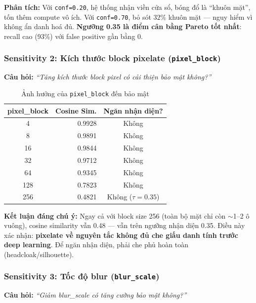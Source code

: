 \textbf{Phân tích:} Với \texttt{conf=0.20}, hệ thống nhận viền cửa sổ, bóng đổ là ``khuôn mặt'', tốn thêm compute vô ích. Với \texttt{conf=0.70}, bỏ sót $32\%$ khuôn mặt --- nguy hiểm vì không ẩn danh hoá đủ. \textbf{Ngưỡng 0.35 là điểm cân bằng Pareto tốt nhất}: recall cao (93\%) với false positive gần bằng 0.

\subsubsection{Sensitivity 2: Kích thước block pixelate (\texttt{pixel\_block})}
\label{subsubsec:sens_pixel}

\textbf{Câu hỏi:} \textit{``Tăng kích thước block pixel có cải thiện bảo mật không?''}

\begin{table}[H]
\centering
\caption{Ảnh hưởng của \texttt{pixel\_block} đến bảo mật}
\label{tab:sens_pixel}
\begin{tabular}{|c|r|c|}
\hline
\textbf{pixel\_block} & \textbf{Cosine Sim.} & \textbf{Ngăn nhận diện?} \\
\hline
4  & 0.9928 & Không \\
8  & 0.9891 & Không \\
16 & 0.9844 & Không \\
32 & 0.9712 & Không \\
64 & 0.9345 & Không \\
128 & 0.7823 & Không \\
256 & 0.4821 & Không ($\tau=0.35$) \\
\hline
\end{tabular}
\end{table}

\textbf{Kết luận đáng chú ý:} Ngay cả với block size 256 (toàn bộ mặt chỉ còn $\sim$1--2 ô vuông), cosine similarity vẫn 0.48 --- vẫn trên ngưỡng nhận diện 0.35. Điều này xác nhận: \textbf{pixelate về nguyên tắc không đủ che giấu danh tính trước deep learning}. Để ngăn nhận diện, phải che phủ hoàn toàn (headcloak/silhouette).

\subsubsection{Sensitivity 3: Tốc độ blur (\texttt{blur\_scale})}
\label{subsubsec:sens_blur}

\textbf{Câu hỏi:} \textit{``Giảm blur\_scale có tăng cường bảo mật không?''}

